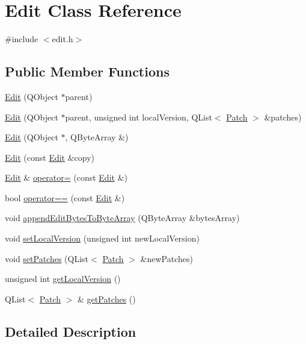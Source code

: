 \hypertarget{class_edit}{
\section{Edit Class Reference}
\label{class_edit}
}


{\ttfamily \#include $<$edit.h$>$}

\subsection*{Public Member Functions}
\begin{DoxyCompactItemize}
\item 
\hyperlink{class_edit_a2e2b40336a71fe081a0d5a8a30dcfcc9}{Edit} (QObject $\ast$parent)
\item 
\hyperlink{class_edit_a14b1bb3d118d63a4ac4031750c9ac049}{Edit} (QObject $\ast$parent, unsigned int localVersion, QList$<$ \hyperlink{class_patch}{Patch} $>$ \&patches)
\item 
\hyperlink{class_edit_aa1ffa564d0ab63a3569eb963abd4fb25}{Edit} (QObject $\ast$, QByteArray \&)
\item 
\hyperlink{class_edit_aa024155f06dc4088cfb8e0b7435906ff}{Edit} (const \hyperlink{class_edit}{Edit} \&copy)
\item 
\hyperlink{class_edit}{Edit} \& \hyperlink{class_edit_a09a58869d34fc98bfafcfd26f87f3fd0}{operator=} (const \hyperlink{class_edit}{Edit} \&)
\item 
bool \hyperlink{class_edit_aafd48217f67a6d778ab1091fb8174245}{operator==} (const \hyperlink{class_edit}{Edit} \&)
\item 
void \hyperlink{class_edit_af7a7bd4cb0fa6ebc6dc238b0613d4b73}{appendEditBytesToByteArray} (QByteArray \&bytesArray)
\item 
void \hyperlink{class_edit_a3f078b7e9186d39f414b08973eaedb3a}{setLocalVersion} (unsigned int newLocalVersion)
\item 
void \hyperlink{class_edit_aa25491f97512a490830b067234519f6a}{setPatches} (QList$<$ \hyperlink{class_patch}{Patch} $>$ \&newPatches)
\item 
unsigned int \hyperlink{class_edit_a6e7a8b3892d028eb64860e87c73aef24}{getLocalVersion} ()
\item 
QList$<$ \hyperlink{class_patch}{Patch} $>$ \& \hyperlink{class_edit_ae4989945109f8d569796b32cd7713969}{getPatches} ()
\end{DoxyCompactItemize}


\subsection{Detailed Description}


